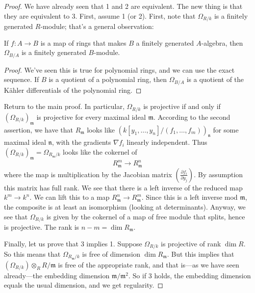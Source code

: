 \begin{proof} 
We have already seen that 1 and 2 are equivalent. The new thing is that they
are equivalent to 3. First, assume 1 (or 2). 
First, note that $\Omega_{R/k}$ is a finitely generated $R$-module; that's a general
observation:

\begin{proposition} 
If $f: A \to B$ is a map of rings that makes $B$ a finitely generated $A$-algebra, then
$\Omega_{B/A}$ is a finitely generated $B$-module.
\end{proposition} 
\begin{proof} 
We've seen this is true for polynomial rings, and we can use the exact
sequence. If $B$ is a quotient of a polynomial ring, then $\Omega_{B/A}$ is a
quotient of the K\"ahler differentials of the polynomial ring.
\end{proof} 
Return to the main proof. In particular, $\Omega_{R/k}$ is projective if and
only if $(\Omega_{R/k})_{\mathfrak{m}}$ is projective for every maximal ideal
$\mathfrak{m}$.  According to the second assertion, we have that
$R_{\mathfrak{m}}$ looks like $(k[y_1, \dots, y_n]/(f_1, \dots,
f_m))_{\mathfrak{n}}$ for some maximal ideal $\mathfrak{n}$, with the
gradients $\nabla f_i$ linearly independent. Thus
$(\Omega_{R/k})_{\mathfrak{m}} = \Omega_{R_{\mathfrak{m}}/k}$ looks like the cokernel of 
\[ R_{\mathfrak{m}}^m \to R_{\mathfrak{m}}^n  \]
where the map is multiplication by the Jacobian matrix $\left(\frac{\partial
f_i}{\partial y_j}  \right)$. By assumption this matrix has full rank. We see
that there is a left inverse of the reduced  map $k^m \to k^n$. 
We can lift this to a map $R_{\mathfrak{m}}^n \to R_{\mathfrak{m}}^m$. Since
this is a left inverse mod $\mathfrak{m}$, the composite is at least an
isomorphism (looking at determinants). Anyway, we see that $\Omega_{R/k}$ is
given by the cokernel of a map of free module that splits, hence is projective.
The rank is $n-m = \dim R_{\mathfrak{m}}$.

Finally, let us prove that 3 implies 1. Suppose $\Omega_{R/k}$ is projective of
rank $\dim R$. So this means that $\Omega_{R_{\mathfrak{m}}/k}$ is free of
dimension $\dim R_{\mathfrak{m}}$. But this implies that $(\Omega_{R/k})
\otimes_R R/\mathfrak{m}$ is free of the appropriate rank, and that is---as we
have seen already---the embedding dimension $\mathfrak{m}/\mathfrak{m}^2$. So
if 3 holds, the embedding dimension equals the usual dimension, and we get
regularity.
\end{proof} 

